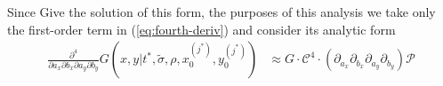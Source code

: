 \documentclass[10pt]{article}
\begin{document}
Since Give the solution of
this form, the purposes of this analysis we take only the first-order
term in (\ref{eq:fourth-deriv}) and consider its analytic form
\begin{align*}
\frac{\partial^4}{\partial a_x \partial b_x \partial a_y \partial b_y} G(x,y|t^{*}, \tilde{\sigma}, \rho, x_0^{(j^*)}, y_0^{(j^*)}) &\approx G \cdot \mathcal{C}^4 \cdot \left(\partial_{a_x}\partial_{b_x} \partial_{a_y}\partial_{b_y} \right)\mathcal{P}
\end{align*}
\end{document}
